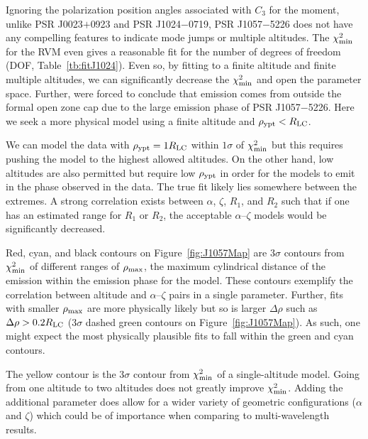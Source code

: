 Ignoring the polarization position angles associated
with $C_{3}$ for the moment, unlike PSR J0023$+$0923 and PSR J1024$-$0719,
PSR J1057$-$5226 does not have any compelling features to indicate mode jumps or
multiple altitudes.  The $\chi^2_{\rm{min}}$ for the RVM even gives a reasonable fit for the 
number of degrees of freedom (DOF, Table~\ref{tb:fitJ1024}).  Even so, 
by fitting to a finite altitude and 
finite multiple altitudes, we can significantly decrease the 
$\chi^2_{\rm{min}}$ and open the parameter space.  Further, \citet{weltevrede2009mapping}
were forced to conclude that emission comes from outside the
formal open zone cap due to the large emission phase of PSR J1057$-$5226.
Here we seek a more physical model using a finite altitude and $\rho_{\rm{ypt}}<R_{\rm{LC}}$.



We can model the data with $\rho_{\rm{ypt}}=1R_{\rm{LC}}$ within 
$1\sigma$ of $\chi^2_{\rm{min}}$ but this 
requires pushing the model to the highest allowed altitudes.  
On the other hand, low altitudes
are also permitted but require low $\rho_{\rm{ypt}}$ in 
order for the models to emit in the phase observed
in the data.  The true fit likely lies somewhere between the extremes.  A strong correlation 
exists between $\alpha$, $\zeta$, $R_{1}$, and $R_{2}$ such 
that if one has an estimated range for $R_{1}$ or $R_{2}$, the acceptable $\alpha$--$\zeta$ 
models would be significantly decreased. 

Red, cyan, and black contours on Figure~\ref{fig:J1057Map} are $3\sigma$ contours
from $\chi^2_{\rm{min}}$ of different ranges of $\rho_{\rm{max}}$, the maximum cylindrical 
distance of the emission within the emission phase for the model.  These contours exemplify
the correlation between altitude and $\alpha$--$\zeta$ pairs in a single parameter.  Further, fits with smaller
$\rho_{\rm{max}}$ are more physically likely but so is larger $\Delta \rho$ such as 
$\Delta \rho> 0.2 R_{\rm{LC}}$ ($3\sigma$ dashed green contours
on Figure~\ref{fig:J1057Map}).  As such, one might expect the most physically plausible
fits to fall within the green and cyan contours.

The yellow contour is the $3\sigma$ contour from $\chi^2_{\rm{min}}$ 
of a single-altitude model.  
Going from one altitude to two altitudes does not greatly improve $\chi^2_{\rm{min}}$.
Adding the additional parameter does allow for a wider variety of geometric
configurations ($\alpha$ and $\zeta$) which could be of importance when comparing
to multi-wavelength results.



